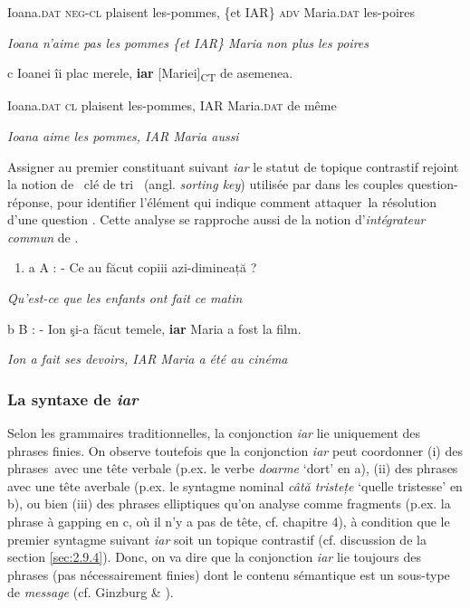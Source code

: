     Ioana\textsc{.dat  neg-cl}  plaisent  les-pommes,  \{et {\textbar} IAR\}  \textsc{adv}  Maria\textsc{.dat}  les-poires

{\itshape
Ioana n'aime pas les pommes \{et {\textbar} IAR\} Maria non plus les poires}

  c  Ioanei  îi  plac  merele,  \textbf{iar}  [Mariei]\textsubscript{CT}  de asemenea.

    Ioana\textsc{.dat  cl}  plaisent  les-pommes,  IAR  Maria\textsc{.dat}  de même

{\itshape
Ioana aime les pommes, IAR Maria aussi} 

Assigner au premier constituant suivant \textit{iar} le statut de topique contrastif rejoint la notion de {\guillemotleft}~clé de tri~{\guillemotright} (angl. \textit{sorting key}) utilisée par \citet{Kuno1982} dans les couples question-réponse, pour identifier l'élément qui indique comment attaquer~la résolution d'une question . Cette analyse se rapproche aussi de la notion d'\textit{intégrateur commun} de \citet{Lang1984}. 


\begin{enumerate}
\item \label{bkm:Ref301983241}a  A : - Ce au făcut copiii azi-dimineață ?


\end{enumerate}
{\itshape
Qu'est-ce que les enfants ont fait ce matin} 

  b  B : - Ion şi-a făcut temele, \textbf{iar} Maria a fost la film.

{\itshape
Ion a fait ses devoirs, IAR Maria a été au cinéma}

\subsubsection{La syntaxe de \textit{iar}}
\label{bkm:Ref301983837}Selon les grammaires traditionnelles, la conjonction \textit{iar} lie uniquement des phrases finies. On observe toutefois que la conjonction \textit{iar} peut coordonner (i) des phrases~avec une tête verbale (p.ex. le verbe \textit{doarme} `dort' en a), (ii) des phrases avec une tête averbale (p.ex. le syntagme nominal \textit{câtă tristețe} `quelle tristesse' en b), ou bien (iii) des phrases elliptiques qu'on analyse comme fragments (p.ex. la phrase à gapping en c, où il n'y a pas de tête, cf. chapitre 4), à condition que le premier syntagme suivant \textit{iar} soit un topique contrastif (cf. discussion de la section \ref{sec:2.9.4}). Donc, on va dire que la conjonction \textit{iar} lie toujours des phrases (pas nécessairement finies) dont le contenu sémantique est un sous-type de \textit{message} (cf. Ginzburg \& \citet{Sag2000}).


